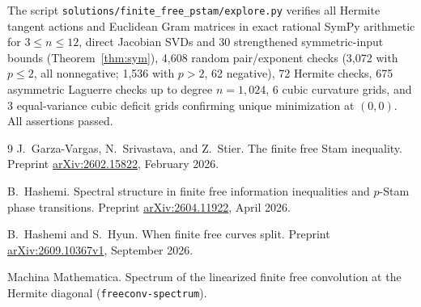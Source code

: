 \documentclass[11pt]{article}
\theoremstyle{plain}
\theoremstyle{definition}
\theoremstyle{remark}
\begin{document}
The script \texttt{solutions/finite\_free\_pstam/explore.py} verifies all Hermite tangent actions and Euclidean Gram matrices in exact rational SymPy arithmetic for $3 \le n \le 12$, direct Jacobian SVDs and 30 strengthened symmetric-input bounds (Theorem~\ref{thm:sym}), 4,608 random pair/exponent checks (3,072 with $p \le 2$, all nonnegative; 1,536 with $p > 2$, 62 negative), 72 Hermite checks, 675 asymmetric Laguerre checks up to degree $n = 1{,}024$, 6 cubic curvature grids, and 3 equal-variance cubic deficit grids confirming unique minimization at $(0,0)$. All assertions passed.

\begin{thebibliography}{9}
J.~Garza-Vargas, N.~Srivastava, and Z.~Stier.
The finite free Stam inequality.
Preprint \href{https://arxiv.org/abs/2602.15822}{arXiv:2602.15822}, February 2026.

B.~Hashemi.
Spectral structure in finite free information inequalities and $p$-Stam phase transitions.
Preprint \href{https://arxiv.org/abs/2604.11922}{arXiv:2604.11922}, April 2026.

B.~Hashemi and S.~Hyun.
When finite free curves split.
Preprint \href{https://arxiv.org/abs/2609.10367v1}{arXiv:2609.10367v1}, September 2026.

Machina Mathematica.
Spectrum of the linearized finite free convolution at the Hermite diagonal (\texttt{freeconv-spectrum}).
\end{thebibliography}
\end{document}
